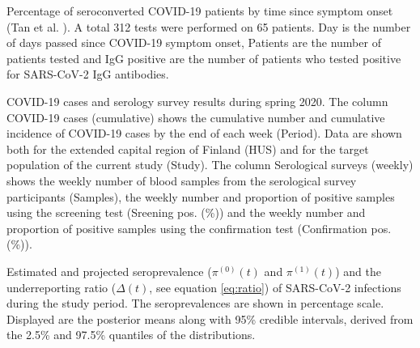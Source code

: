 
\begin{table}[!htb]
\centering
\caption{Percentage of seroconverted COVID-19 patients by time since symptom onset (Tan et al. \cite{Tan2020}). A total 312 tests were performed on 65 patients. Day is the number of days passed since COVID-19 symptom onset, Patients are the number of patients tested and IgG positive are the number of patients who tested positive for SARS-CoV-2 IgG antibodies.}



\label{tab:Tandata}
\end{table}


\begin{table}[!htb]
\caption{COVID-19 cases and serology survey results during spring 2020. The column COVID-19 cases (cumulative) shows the cumulative number and cumulative incidence of COVID-19 cases by the end of each week (Period). Data are shown both for the extended capital region of Finland (HUS) and for the target population of the current study (Study). The column Serological surveys (weekly) shows the weekly number of blood samples from the serological survey participants (Samples), the weekly number and proportion of positive samples using the screening test (Sreening pos. (\%)) and the weekly number and proportion of positive samples using the confirmation test (Confirmation pos. (\%)). }

\label{tab:covidcase}
\end{table}


\begin{table}[!htb]
\caption{Estimated and projected seroprevalence ($\pi^{(0)}(t)$ and $\pi^{(1)}(t)$) and the underreporting ratio ($\Delta(t)$, see equation \ref{eq:ratio}) of SARS-CoV-2 infections during the study period. The seroprevalences are shown in percentage scale. Displayed are the posterior means along with 95\% credible intervals, derived from the 2.5\% and 97.5\% quantiles of the distributions.}

\label{tab:results}
\end{table}

